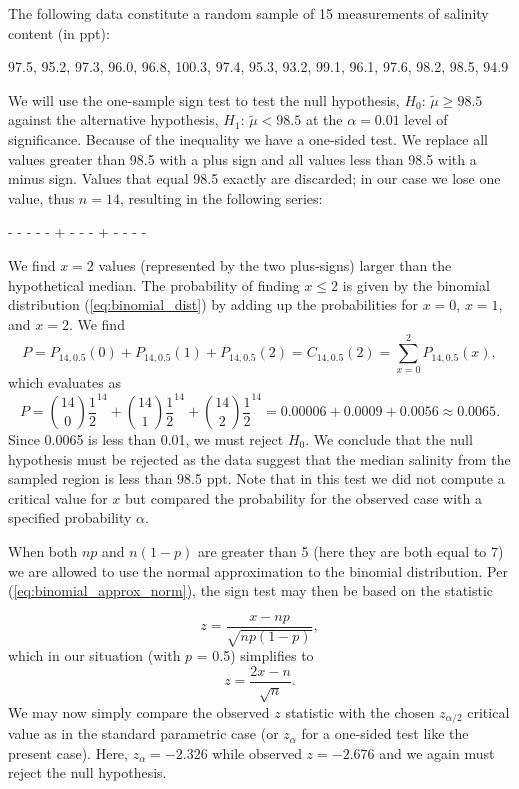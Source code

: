 \begin{example}
The following data constitute a random sample of 15 measurements of salinity
content (in ppt):
\begin{center}
	97.5, 95.2, 97.3, 96.0, 96.8, 100.3, 97.4, 95.3, 93.2, 99.1, 96.1, 97.6, 98.2, 98.5, 94.9
\end{center}
We will use the one-sample sign test to test the null hypothesis, $H_0$: $\tilde{\mu} \geq 98.5$ against the
alternative hypothesis, $H_1$: $\tilde{\mu} < 98.5$ at the $\alpha = 0.01$ level of significance.  Because of the inequality
we have a one-sided test.  We replace all values greater than 98.5 with a plus sign and all values less
than 98.5 with a minus sign.  Values that equal 98.5 exactly are discarded; in our case we lose one value,
thus $n = 14$, resulting in the following series:
\begin{center}
	- - - - - + - - - + - - - -
\end{center}
We find $x = 2$ values (represented by the two plus-signs) larger than the hypothetical median.  The probability of finding $x \le 2$ is given by
the binomial distribution (\ref{eq:binomial_dist}) by adding up the probabilities for $x = 0$, $x = 1$, and
$x = 2$.  We find
\begin{equation}
P = P_{14,0.5}(0) + P_{14,0.5}(1) + P_{14,0.5}(2) = C_{14,0.5}(2) = \sum_{x=0}^{2} P_{14,0.5}(x),
\end{equation}
which evaluates as
\begin{equation}
P = \binom{14}{0} \frac{1}{2}^{14} + \binom{14}{1} \frac{1}{2}^{14} + \binom{14}{2} \frac{1}{2}^{14} = 0.00006 + 0.0009 + 0.0056 \approx 0.0065.
\end{equation}
Since 0.0065 is less than 0.01, we must reject $H_0$. We conclude that the null hypothesis must be rejected as the
data suggest that the median salinity from the sampled
region is less than 98.5 ppt.  Note that in this test we did not compute a critical value for $x$ but compared
the probability for the observed case with a specified probability $\alpha$.
\end{example}

When both $np$ and $n(1 - p)$ are greater than 5 (here they are both equal to 7) we are allowed to use the normal approximation to
the binomial distribution.  Per (\ref{eq:binomial_approx_norm}), the sign test may then be based on the statistic

\begin{equation}
z = \frac{x - np}{\sqrt{np(1-p)}},
\end{equation}
which in our situation (with $p$ = 0.5) simplifies to
\begin{equation}
z = \frac{2x - n}{\sqrt{n}}.
\end{equation}
We may now simply compare the observed $z$ statistic with the chosen $z_{\alpha/2}$
critical value as in the standard parametric case (or $z_{\alpha}$ for a one-sided test like the present case).  Here,
$z_{\alpha} = -2.326$ while observed $z = -2.676$ and we again must reject the null hypothesis.

